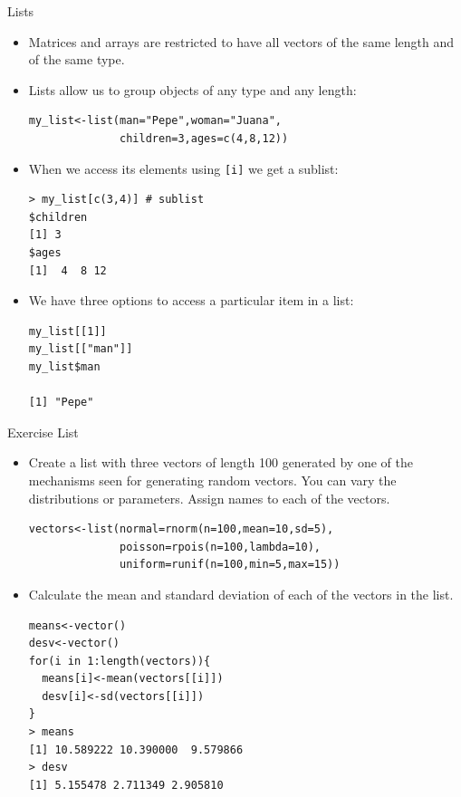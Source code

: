 \documentclass[handout]{beamer}
\begin{document}
\begin{frame}[fragile]{Lists}
\scriptsize{
\begin{itemize}
 \item Matrices and arrays are restricted to have all vectors of the same length and of the same type.
 \item Lists allow us to group objects of any type and any length:
 \begin{verbatim}
my_list<-list(man="Pepe",woman="Juana",
              children=3,ages=c(4,8,12))
 \end{verbatim}
 \item When we access its elements using \verb+[i]+ we get a sublist:
 \begin{verbatim}
> my_list[c(3,4)] # sublist
$children
[1] 3
$ages
[1]  4  8 12
 \end{verbatim}
\item We have three options to access a particular item in a list:
\begin{verbatim}
my_list[[1]]
my_list[["man"]]
my_list$man

[1] "Pepe"
\end{verbatim}


\end{itemize}



}
\end{frame}

\begin{frame}[fragile]{Exercise List}
\scriptsize{

\begin{itemize}
 \item Create a list with three vectors of length 100 generated by one of the mechanisms seen for generating random vectors. You can vary the distributions or parameters. Assign names to each of the vectors.
 \begin{verbatim}
vectors<-list(normal=rnorm(n=100,mean=10,sd=5),
              poisson=rpois(n=100,lambda=10),
              uniform=runif(n=100,min=5,max=15))
 \end{verbatim}

\item Calculate the mean and standard deviation of each of the vectors in the list. 
\begin{verbatim}
means<-vector()
desv<-vector()
for(i in 1:length(vectors)){
  means[i]<-mean(vectors[[i]])
  desv[i]<-sd(vectors[[i]])
}
> means
[1] 10.589222 10.390000  9.579866
> desv
[1] 5.155478 2.711349 2.905810
\end{verbatim}

 
\end{itemize}

}
\end{frame}
\end{document}
